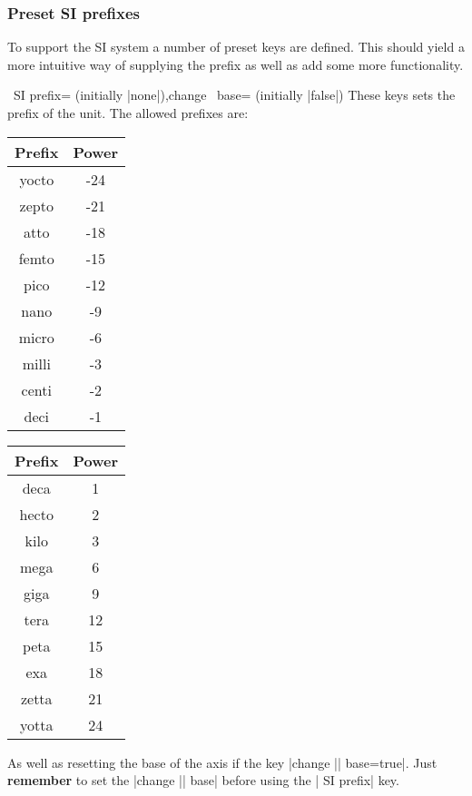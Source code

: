 \subsubsection{Preset SI prefixes}
\label{sec:SI:prefix}
To support the SI system a number of preset keys are defined. This should yield a more intuitive way of supplying the prefix as well as add some more
functionality. 
\begin{pgfplotsxykeylist}{\x\ SI prefix= (initially |none|),change \x\
      base= (initially |false|)}
  These keys sets the prefix of the unit. The allowed prefixes are:
  
  \begin{center}
    \begin{tabular}{>{\ttfamily}cc}
      \toprule
      \rm Prefix & Power\\
      \midrule
      yocto & -24\\
      zepto & -21\\
      atto & -18\\
      femto & -15\\
      pico & -12\\
      nano& -9\\
      micro & -6\\
      milli & -3\\
      centi& -2\\
      deci& -1\\
      \bottomrule
    \end{tabular}\qquad\qquad
    \begin{tabular}{>{\ttfamily}cc}
      \toprule
      \rm Prefix & Power\\
      \midrule
      deca & 1\\
      hecto & 2\\
      kilo & 3\\
      mega & 6\\
      giga & 9\\
      tera& 12\\
      peta & 15\\
      exa & 18\\
      zetta& 21\\
      yotta& 24\\
      \bottomrule
    \end{tabular}
  \end{center}
  
  As well as resetting the base of the axis if the key |change || base=true|. Just \textbf{remember} to
  set the |change |\meta{axis}| base| before using the \meta{axis}| SI prefix| key. 


\end{pgfplotsxykeylist}
